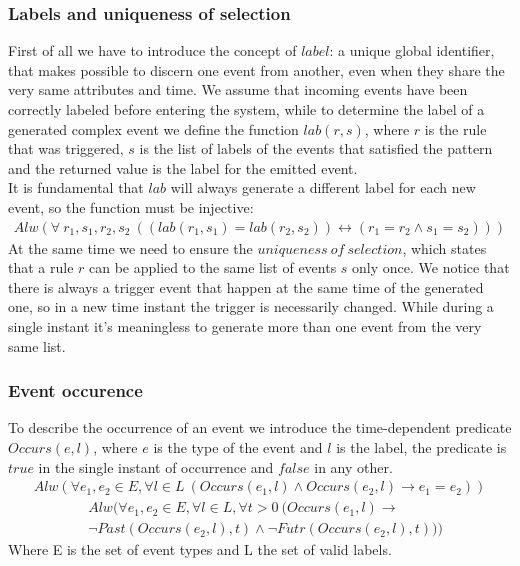\subsubsection{Labels and uniqueness of selection}
First of all we have to introduce the concept of $label$: a unique global identifier, that makes possible to discern one event from another, even when they share the very same attributes and time. We assume that incoming events have been correctly labeled before entering the system, while to determine the label of a generated complex event we define the function $lab(r, s)$, where $r$ is the rule that was triggered, $s$ is the list of labels of the events that satisfied the pattern and the returned value is the label for the emitted event.\\
It is fundamental that $lab$ will always generate a different label for each new event, so the function must be injective:
\begin{align*}
Alw(\forall\ r_1,s_1,r_2,s_2\ ((lab(r_1, s_1) = lab(r_2, s_2)) \leftrightarrow (r_1=r_2 \wedge s_1=s_2)))
\end{align*}
At the same time we need to ensure the $uniqueness\ of\ selection$, which states that a rule $r$ can be applied to the same list of events $s$ only once. We notice that there is always a trigger event that happen at the same time of the generated one, so in a new time instant the trigger is necessarily changed. While during a single instant it's meaningless to generate more than one event from the very same list.

\subsubsection{Event occurence}
To describe the occurrence of an event we introduce the time-dependent predicate $Occurs(e, l)$, where $e$ is the type of the event and $l$ is the label, the predicate is $true$ in the single instant of occurrence and $false$ in any other.
\begin{align*}
Alw(\forall e_1, e_2 \in E, \forall l \in L\ (Occurs(e_1, l) \wedge Occurs(e_2, l) \rightarrow e_1 = e_2))
\end{align*}
\begin{align*}
  &Alw(\forall e_1, e_2 \in E, \forall l \in L, \forall t > 0\ (Occurs(e_1, l) \rightarrow\\
  &\neg Past(Occurs(e_2, l), t) \wedge \neg Futr(Occurs(e_2, l), t)))
\end{align*}
Where E is the set of event types and L the set of valid labels.

